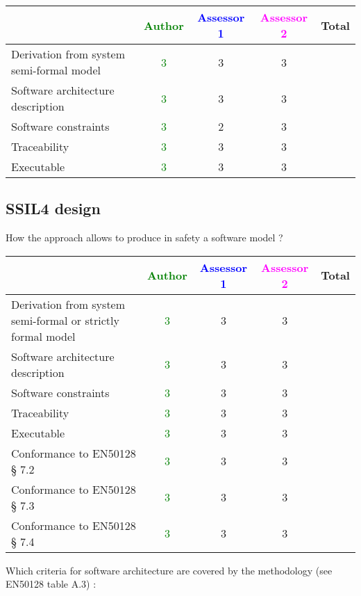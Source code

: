 \begin{tabular}{|l | c | c | c | c|}
\hline
& \textcolor{green}{Author} & \textcolor{blue}{Assessor 1} & \textcolor{magenta}{Assessor 2} & Total \\
\hline
Derivation from system semi-formal model  & \textcolor{green}{3} & 3 &3 &  \\
\hline 
Software architecture description  & \textcolor{green}{3} & 3 &3 &  \\
\hline
Software constraints  & \textcolor{green}{3} & 2 &3 &  \\
\hline
Traceability  & \textcolor{green}{3} & 3 &3 &  \\
\hline
Executable  & \textcolor{green}{3} & 3 &3 &  \\
\hline
\end{tabular}

\subsection{SSIL4 design}

How the approach allows to  produce in safety a software model ?

\begin{tabular}{|l | c | c | c | c|}
\hline
& \textcolor{green}{Author} & \textcolor{blue}{Assessor 1} & \textcolor{magenta}{Assessor 2} & Total \\
\hline
Derivation from system semi-formal or strictly formal model  &
\textcolor{green}{3} & 3 &3 &  \\
\hline 
Software architecture description  & \textcolor{green}{3} & 3 &3 &  \\
\hline
Software constraints  & \textcolor{green}{3} & 3 &3 &  \\
\hline
Traceability  & \textcolor{green}{3} & 3 &3 &  \\
\hline
Executable  & \textcolor{green}{3} & 3 &3 &  \\
\hline
Conformance to EN50128 § 7.2  & \textcolor{green}{3} & 3 &3 &  \\
\hline
Conformance to EN50128 § 7.3  & \textcolor{green}{3} & 3 &3 &  \\
\hline
Conformance to EN50128 § 7.4  & \textcolor{green}{3}& 3 &3 &  \\
\hline
\end{tabular}

Which criteria for software architecture are covered by the methodology
(see EN50128 table A.3) :


